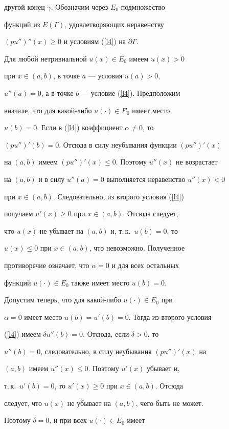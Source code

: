 {{{{{{{другой конец $\gamma$. Обозначим через $E_0$ подмножество


функций из $E(\Gamma)$, удовлетворяющих неравенству


$(pu'')''(x)\geq 0$ и условиям (\ref{l4}) на $\partial\Gamma$.


Для любой нетривиальной $u(x)\in E_0 $ имеем $u(x)>0$


при $x\in (a,b)$, в точке $a$ --- условия $u(a)>0$,


$u''(a)=0$, а в точке $b$ --- условие (\ref{l4}). Предположим


вначале, что для какой-либо $u(\cdot)\in E_0$ имеет место


$u(b)=0$. Если в (\ref{l4}) коэффициент $\alpha\neq 0$, то


$(pu'')'(b)= 0$. Отсюда в силу неубывания функции $(pu'')'(x)$


на $(a,b)$ имеем $(pu'')'(x)\leq 0$. Поэтому $u''(x)$ не возрастает


на $(a,b)$ и в силу $u''(a)= 0$ выполняется неравенство $u''(x)<0$


при $x\in (a,b)$. Следовательно, из второго условия (\ref{l4})


получаем $u'(x) \geq 0$ при $x\in (a,b) $. Отсюда следует,


что $u(x) $ не убывает на $(a,b)$ и, т.\,к.~$u(b)=0$, то


$u(x)\leq 0$ при $x\in (a,b)$, что невозможно. Полученное


противоречие означает, что $\alpha= 0$ и для всех остальных


функций $u(\cdot)\in E_0 $ также имеет место $u(b)=0$.





Допустим теперь, что для какой-либо $u(\cdot)\in E_0$ при


$\alpha= 0$ имеет место $u(b)=u'(b)=0$. Тогда из второго условия


(\ref{l4}) имеем $\delta u''(b)=0$. Отсюда, если $\delta >0$, то


$u''(b)=0 $, следовательно, в силу неубывания $(pu'')'(x)$ на


$(a,b)$ имеем $u''(x)\leq 0$. Поэтому $u'(x)$ убывает и,


т.\,к.~$u'(b)=0$, то $u'(x)\geq 0$ при $x\in (a,b) $. Отсюда


следует, что $u(x)$ не убывает на $ (a,b) $, чего быть не может.


Поэтому $\delta=0$, и при всех $u(\cdot)\in E_0 $ имеет


}}}}}}}
